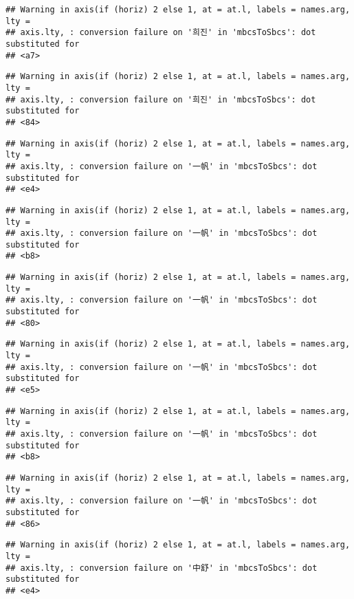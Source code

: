 \documentclass[
]{article}
\begin{document}
\begin{verbatim}
## Warning in axis(if (horiz) 2 else 1, at = at.l, labels = names.arg, lty =
## axis.lty, : conversion failure on '희진' in 'mbcsToSbcs': dot substituted for
## <a7>
\end{verbatim}

\begin{verbatim}
## Warning in axis(if (horiz) 2 else 1, at = at.l, labels = names.arg, lty =
## axis.lty, : conversion failure on '희진' in 'mbcsToSbcs': dot substituted for
## <84>
\end{verbatim}

\begin{verbatim}
## Warning in axis(if (horiz) 2 else 1, at = at.l, labels = names.arg, lty =
## axis.lty, : conversion failure on '一帆' in 'mbcsToSbcs': dot substituted for
## <e4>
\end{verbatim}

\begin{verbatim}
## Warning in axis(if (horiz) 2 else 1, at = at.l, labels = names.arg, lty =
## axis.lty, : conversion failure on '一帆' in 'mbcsToSbcs': dot substituted for
## <b8>
\end{verbatim}

\begin{verbatim}
## Warning in axis(if (horiz) 2 else 1, at = at.l, labels = names.arg, lty =
## axis.lty, : conversion failure on '一帆' in 'mbcsToSbcs': dot substituted for
## <80>
\end{verbatim}

\begin{verbatim}
## Warning in axis(if (horiz) 2 else 1, at = at.l, labels = names.arg, lty =
## axis.lty, : conversion failure on '一帆' in 'mbcsToSbcs': dot substituted for
## <e5>
\end{verbatim}

\begin{verbatim}
## Warning in axis(if (horiz) 2 else 1, at = at.l, labels = names.arg, lty =
## axis.lty, : conversion failure on '一帆' in 'mbcsToSbcs': dot substituted for
## <b8>
\end{verbatim}

\begin{verbatim}
## Warning in axis(if (horiz) 2 else 1, at = at.l, labels = names.arg, lty =
## axis.lty, : conversion failure on '一帆' in 'mbcsToSbcs': dot substituted for
## <86>
\end{verbatim}

\begin{verbatim}
## Warning in axis(if (horiz) 2 else 1, at = at.l, labels = names.arg, lty =
## axis.lty, : conversion failure on '中舒' in 'mbcsToSbcs': dot substituted for
## <e4>
\end{verbatim}
\end{document}
